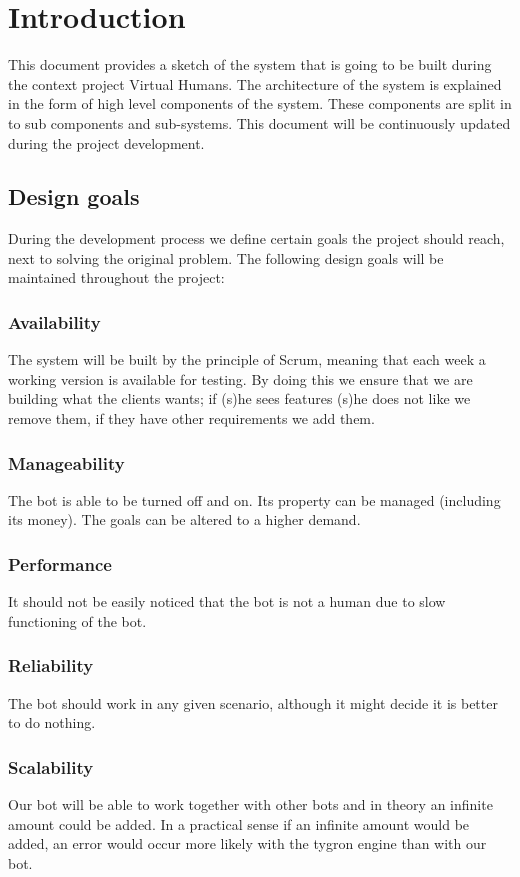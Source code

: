 \section{Introduction}

This document provides a sketch of the system that is going to be built during the context project Virtual Humans. The architecture of the system is explained in the form of high level components of the system. These components are split in to sub components and sub-systems. This document will be continuously updated during the project development.

\subsection{Design goals}
During the development process we define certain goals the project should reach, next to solving the original problem. The following design goals will be maintained throughout the project:

\subsubsection{Availability}
The system will be built by the principle of Scrum, meaning that each week a working version is available for testing. By doing this we ensure that we are building what the clients wants; if (s)he sees features (s)he does not like we remove them, if they have other requirements we add them. 

\subsubsection{Manageability}
The bot is able to be turned off and on. Its property can be managed (including its money). The goals can be altered to a higher demand.

\subsubsection{Performance}
It should not be easily noticed that the bot is not a human due to slow functioning of the bot.

\subsubsection{Reliability}
The bot should work in any given scenario, although it might decide it is better to do nothing.

\subsubsection{Scalability}
Our bot will be able to work together with other bots and in theory an infinite amount could be added. In a practical sense if an infinite amount would be added, an error would occur more likely with the tygron engine than with our bot.

\newpage